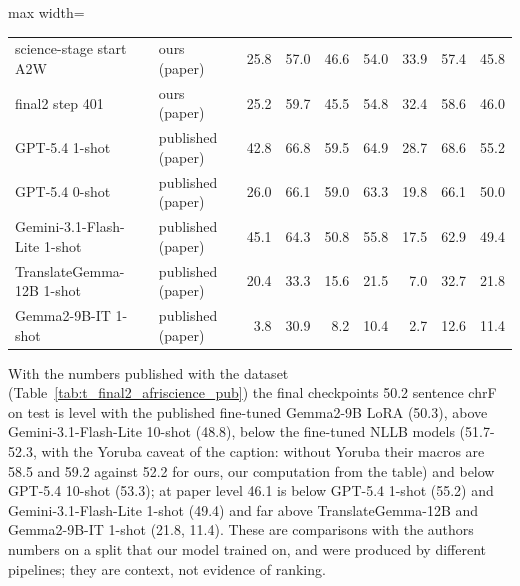 \begin{table}[t]
\begin{adjustbox}{max width=\linewidth}
{\begin{tabular}{@{}llrrrrrrr@{}}
science-stage start A2W & ours (paper) & 25.8 & 57.0 & 46.6 & 54.0 & 33.9 & 57.4 & 45.8 \\
final2 step 401 & ours (paper) & 25.2 & 59.7 & 45.5 & 54.8 & 32.4 & 58.6 & 46.0 \\
GPT-5.4 1-shot & published (paper) & 42.8 & 66.8 & 59.5 & 64.9 & 28.7 & 68.6 & 55.2 \\
GPT-5.4 0-shot & published (paper) & 26.0 & 66.1 & 59.0 & 63.3 & 19.8 & 66.1 & 50.0 \\
Gemini-3.1-Flash-Lite 1-shot & published (paper) & 45.1 & 64.3 & 50.8 & 55.8 & 17.5 & 62.9 & 49.4 \\
TranslateGemma-12B 1-shot & published (paper) & 20.4 & 33.3 & 15.6 & 21.5 & 7.0 & 32.7 & 21.8 \\
Gemma2-9B-IT 1-shot & published (paper) & 3.8 & 30.9 & 8.2 & 10.4 & 2.7 & 12.6 & 11.4 \\
\bottomrule
\end{tabular}
}
\end{adjustbox}
\end{table}

With the numbers published with the dataset \citep{abdulmumin2026afriscience} (Table~\ref{tab:t_final2_afriscience_pub}) the final checkpoint\textquotesingle s 50.2 sentence chrF on test is level with the published fine-tuned Gemma2-9B LoRA (50.3), above Gemini-3.1-Flash-Lite 10-shot (48.8), below the fine-tuned NLLB models (51.7-52.3, with the Yoruba caveat of the caption: without Yoruba their macros are 58.5 and 59.2 against 52.2 for ours, our computation from the table) and below GPT-5.4 10-shot (53.3); at paper level 46.1 is below GPT-5.4 1-shot (55.2) and Gemini-3.1-Flash-Lite 1-shot (49.4) and far above TranslateGemma-12B and Gemma2-9B-IT 1-shot (21.8, 11.4). These are comparisons with the authors\textquotesingle{} numbers on a split that our model trained on, and were produced by different pipelines; they are context, not evidence of ranking.

